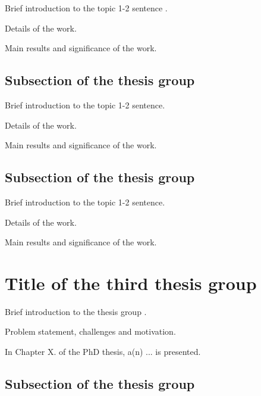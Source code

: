 \documentclass[12pt,a4paper]{extarticle}
\begin{document}
Brief introduction to the topic 1-2 sentence \cite{b:isis-floodrouting}.

Details of the work.

Main results and significance of the work.

\subsection{Subsection of the thesis group}


Brief introduction to the topic 1-2 sentence.

Details of the work.

Main results and significance of the work.

\subsection{Subsection of the thesis group}


Brief introduction to the topic 1-2 sentence.

Details of the work.

Main results and significance of the work.

\section{Title of the third thesis group}

Brief introduction to the thesis group \cite{b:isis-tracking-techreport}.

Problem statement, challenges and motivation.

In Chapter X. of the PhD thesis, a(n) ... is presented.

\subsection{Subsection of the thesis group}
\end{document}
